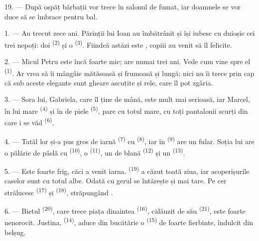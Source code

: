 19. --- După ospăț bărbații vor trece în salonul de fumat, iar doamnele se vor duce
să se îmbrace pentru bal.

\VUsaut{5.0mm}
\VUsaut{1.6mm}
\VUsaut{2.6mm}

\VUsaut{3.0mm}

1. --- Au trecut zece ani. Părinții lui Ioan au îmbătrânit și își iubesc cu
duioșie cei trei nepoți: doi  \textsuperscript{(2)} și o
 \textsuperscript{(3)}. Fiindcă astăzi este , copiii au venit să îl felicite.

2. --- Micul Petru este încă foarte mic; are numai trei ani. Vede cum vine spre el
 \textsuperscript{(1)}. Ar vrea să îi mângâie 
mătăsoasă și frumoasă și  lungă; nici nu îi trece prin cap că sub
aceste  elegante sunt gheare ascuțite și rele, care îl pot zgâria.

3. --- Sora lui, Gabriela, care îl ține de mână, este mult mai serioasă, iar
Marcel, în  lui mare \textsuperscript{(4)} și în 
de piele \textsuperscript{(5)}, pare cu totul mare, cu toți pantalonii scurți din
care i se văd  \textsuperscript{(6)}.

4. --- Tatăl lor și-a pus  gros de iarnă \textsuperscript{(7)} cu
 \textsuperscript{(8)}, iar în 
\textsuperscript{(9)} are un fular. Soția lui are o pălărie de pâslă cu
 \textsuperscript{(10)}, o  \textsuperscript{(11)}, un
 de blană \textsuperscript{(12)} și un 
\textsuperscript{(13)}.

5. --- Este foarte frig, căci a venit iarna. 
\textsuperscript{(19)} a căzut toată ziua, iar acoperișurile caselor sunt cu totul
albe. Odată cu  gerul se întărește și mai tare. Pe cer
strălucesc  \textsuperscript{(17)} și 
\textsuperscript{(18)}, străpungând .

\VUsaut{4.2mm}
\VUsaut{3.0mm}

6. --- Bietul  \textsuperscript{(20)}, care trece piața dinaintea
 \textsuperscript{(16)}, călăuzit de  său
\textsuperscript{(21)}, este foarte nenorocit. Justina, 
\textsuperscript{(14)}, aduce din bucătărie o 
\textsuperscript{(15)} de  foarte fierbinte, îndulcit din
belșug.


